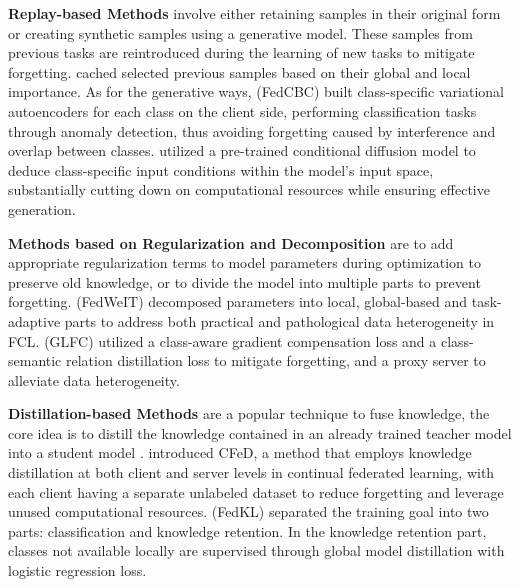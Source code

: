 \textbf{Replay-based Methods} involve either retaining samples in their original form or creating synthetic samples using a generative model. These samples from previous tasks are reintroduced during the learning of new tasks to mitigate forgetting. \citet{li2024towards,li2024sr} cached selected previous samples based on their global and local importance. 
As for the generative ways, \citet{yu2024overcoming} (FedCBC) built class-specific variational autoencoders for each class on the client side, performing classification tasks through anomaly detection, thus avoiding forgetting caused by interference and overlap between classes. \citet{liang2025diffusion} utilized a pre-trained conditional diffusion model to deduce class-specific input conditions within the model's input space, substantially cutting down on computational resources while ensuring effective generation.



\textbf{Methods based on Regularization and Decomposition} are to add appropriate regularization terms to model parameters during optimization to preserve old knowledge, or to divide the model into multiple parts to prevent forgetting.
\citet{yoon2021federated} (FedWeIT) decomposed parameters into local, global-based and task-adaptive parts to address both practical and pathological data heterogeneity in FCL. \citet{dong2022federated} (GLFC) utilized a class-aware gradient compensation loss and a class-semantic relation distillation loss to mitigate forgetting, and a proxy server to alleviate data heterogeneity.



\textbf{Distillation-based Methods} are a popular technique to fuse knowledge, the core idea is to distill the knowledge contained in an already trained teacher model into a student model \cite{hinton2015distilling}. \citet{ma2022continual} introduced CFeD, a method that employs knowledge distillation at both client and server levels in continual federated learning, with each client having a separate unlabeled dataset to reduce forgetting and leverage unused computational resources. 
\citet{wei2022knowledge} (FedKL) separated the training goal into two parts: classification and knowledge retention. In the knowledge retention part, classes not available locally are supervised through global model distillation with logistic regression loss.



